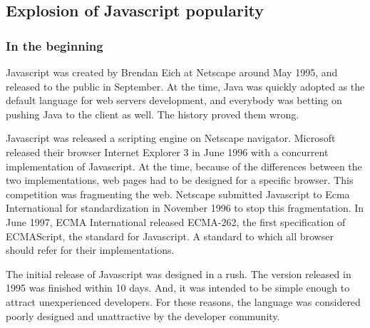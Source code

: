 \subsection{Explosion of Javascript popularity}

\subsubsection{In the beginning}

Javascript was created by Brendan Eich at Netscape around May 1995, and released to the public in September.
At the time, Java was quickly adopted as the default language for web servers development, and everybody was betting on pushing Java to the client as well.
The history proved them wrong.

Javascript was released a scripting engine on Netscape navigator.
Microsoft released their browser Internet Explorer 3 in June 1996 with a concurrent implementation of Javascript.
At the time, because of the differences between the two implementations, web pages had to be designed for a specific browser.
This competition was fragmenting the web.
Netscape submitted Javascript to Ecma International for standardization in November 1996 to stop this fragmentation.
In June 1997, ECMA International released ECMA-262, the first specification of ECMAScript, the standard for Javascript.
A standard to which all browser should refer for their implementations.

The initial release of Javascript was designed in a rush. The version released in 1995 was finished within 10 days.
And, it was intended to be simple enough to attract unexperienced developers.
For these reasons, the language was considered poorly designed and unattractive by the developer community.


